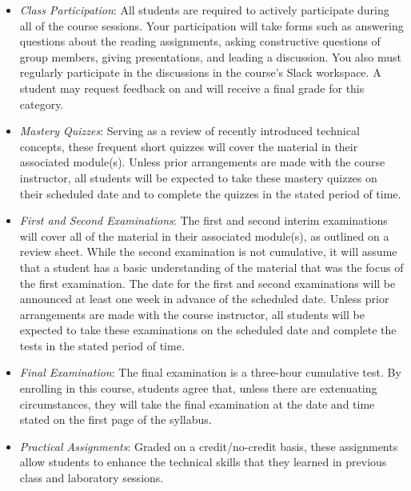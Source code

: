 \documentclass[11pt]{article}
\begin{document}
\begin{itemize}

  \item {\em Class Participation\/}: All students are required to actively
    participate during all of the course sessions. Your participation will take
    forms such as answering questions about the reading assignments, asking
    constructive questions of group members, giving presentations, and leading a
    discussion. You also must regularly participate in the discussions in the
    course's Slack workspace. A student may request feedback on and will receive
    a final grade for this category.

  \item {\em Mastery Quizzes\/}: Serving as a review of recently introduced
    technical concepts, these frequent short quizzes will cover the material in
    their associated module(s). Unless prior arrangements are made with the
    course instructor, all students will be expected to take these mastery
    quizzes on their scheduled date and to complete the quizzes in the stated
    period of time.

  \item {\em First and Second Examinations\/}: The first and second interim
    examinations will cover all of the material in their associated module(s),
    as outlined on a review sheet. While the second examination is not
    cumulative, it will assume that a student has a basic understanding of the
    material that was the focus of the first examination. The date for the first
    and second examinations will be announced at least one week in advance of
    the scheduled date. Unless prior arrangements are made with the course
    instructor, all students will be expected to take these examinations on the
    scheduled date and complete the tests in the stated period of time.

  \item {\em Final Examination\/}: The final examination is a three-hour
    cumulative test. By enrolling in this course, students agree that, unless
    there are extenuating circumstances, they will take the final examination at
    the date and time stated on the first page of the syllabus.

  \item {\em Practical Assignments\/}: Graded on a credit/no-credit basis, these
    assignments allow students to enhance the technical skills that they learned
    in previous class and laboratory sessions.


\end{itemize}
\end{document}
